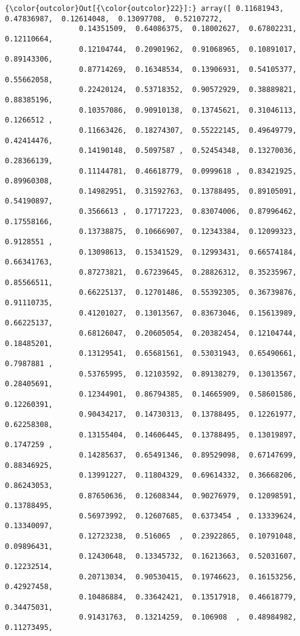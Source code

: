 \documentclass[11pt]{article}
\begin{document}
\begin{Verbatim}[commandchars=\\\{\}]
{\color{outcolor}Out[{\color{outcolor}22}]:} array([ 0.11681943,  0.47836987,  0.12614048,  0.13097708,  0.52107272,
                 0.14351509,  0.64086375,  0.18002627,  0.67802231,  0.12110664,
                 0.12104744,  0.20901962,  0.91068965,  0.10891017,  0.89143306,
                 0.87714269,  0.16348534,  0.13906931,  0.54105377,  0.55662058,
                 0.22420124,  0.53718352,  0.90572929,  0.38889821,  0.88385196,
                 0.10357086,  0.90910138,  0.13745621,  0.31046113,  0.1266512 ,
                 0.11663426,  0.18274307,  0.55222145,  0.49649779,  0.42414476,
                 0.14190148,  0.5097587 ,  0.52454348,  0.13270036,  0.28366139,
                 0.11144781,  0.46618779,  0.0999618 ,  0.83421925,  0.89960308,
                 0.14982951,  0.31592763,  0.13788495,  0.89105091,  0.54190897,
                 0.3566613 ,  0.17717223,  0.83074006,  0.87996462,  0.17558166,
                 0.13738875,  0.10666907,  0.12343384,  0.12099323,  0.9128551 ,
                 0.13098613,  0.15341529,  0.12993431,  0.66574184,  0.66341763,
                 0.87273821,  0.67239645,  0.28826312,  0.35235967,  0.85566511,
                 0.66225137,  0.12701486,  0.55392305,  0.36739876,  0.91110735,
                 0.41201027,  0.13013567,  0.83673046,  0.15613989,  0.66225137,
                 0.68126047,  0.20605054,  0.20382454,  0.12104744,  0.18485201,
                 0.13129541,  0.65681561,  0.53031943,  0.65490661,  0.7987881 ,
                 0.53765995,  0.12103592,  0.89138279,  0.13013567,  0.28405691,
                 0.12344901,  0.86794385,  0.14665909,  0.58601586,  0.12260391,
                 0.90434217,  0.14730313,  0.13788495,  0.12261977,  0.62258308,
                 0.13155404,  0.14606445,  0.13788495,  0.13019897,  0.1747259 ,
                 0.14285637,  0.65491346,  0.89529098,  0.67147699,  0.88346925,
                 0.13991227,  0.11804329,  0.69614332,  0.36668206,  0.86243053,
                 0.87650636,  0.12608344,  0.90276979,  0.12098591,  0.13788495,
                 0.56973992,  0.12607685,  0.6373454 ,  0.13339624,  0.13340097,
                 0.12723238,  0.516065  ,  0.23922865,  0.10791048,  0.09896431,
                 0.12430648,  0.13345732,  0.16213663,  0.52031607,  0.12232514,
                 0.20713034,  0.90530415,  0.19746623,  0.16153256,  0.42927458,
                 0.10486884,  0.33642421,  0.13517918,  0.46618779,  0.34475031,
                 0.91431763,  0.13214259,  0.106908  ,  0.48984982,  0.11273495,

\end{Verbatim}
\end{document}
